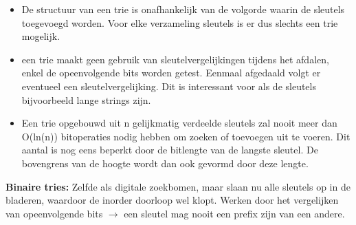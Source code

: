 \begin{itemize}
\item De structuur van een trie is onafhankelijk van de volgorde waarin de sleutels toegevoegd worden. Voor elke verzameling sleutels is er dus slechts een trie mogelijk.
\item een trie maakt geen gebruik van sleutelvergelijkingen tijdens het afdalen, enkel de opeenvolgende bits worden getest. Eenmaal afgedaald volgt er eventueel een sleutelvergelijking. Dit is interessant voor als de sleutels bijvoorbeeld lange strings zijn. 
\item Een trie opgebouwd uit n gelijkmatig verdeelde sleutels zal nooit meer dan O(ln(n)) bitoperaties nodig hebben om zoeken of toevoegen uit te voeren. Dit aantal is nog eens beperkt door de bitlengte van de langste sleutel. De bovengrens van de hoogte wordt dan ook gevormd door deze lengte.
\end{itemize}

\begin{mdframed}[leftmargin=10pt,rightmargin=10pt]
\textbf{Binaire tries:} Zelfde als digitale zoekbomen, maar slaan nu alle sleutels op in de bladeren, waardoor de inorder doorloop wel klopt. Werken door het vergelijken van opeenvolgende bits $\rightarrow$ een sleutel mag nooit een prefix zijn van een andere.
\end{mdframed}

\clearpage
